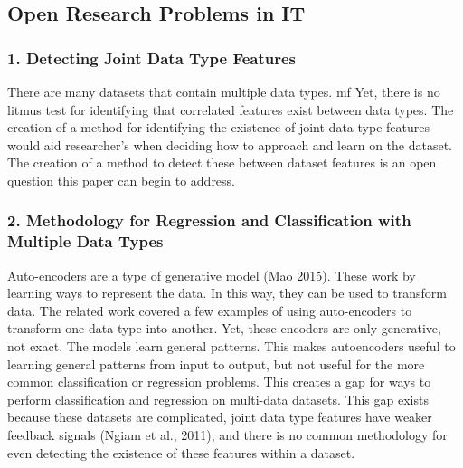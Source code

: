 \subsection{Open Research Problems in IT}

\subsubsection{1. Detecting Joint Data Type Features}
There are many datasets that contain multiple data types. mf Yet, there is no litmus test for identifying that correlated features exist between data types.  The creation of a method for identifying the existence of joint data type features would aid researcher's when deciding how to approach and learn on the dataset.  The creation of a method to detect these between dataset features is an open question this paper can begin to address.

\subsubsection{2. Methodology for Regression and Classification with Multiple Data Types}
Auto-encoders are a type of generative model (Mao 2015). These work by learning ways to represent the data.  In this way, they can be used to transform data.  The related work covered a few examples of using auto-encoders to transform one data type into another.  Yet, these encoders are only generative, not exact.  The models learn general patterns.  This makes autoencoders useful to learning general patterns from input to output, but not useful for the more common classification or regression problems.  This creates a gap for ways to perform classification and regression on multi-data datasets.  This gap exists because these datasets are complicated, joint data type features have weaker feedback signals (Ngiam et al., 2011), and there is no common methodology for even detecting the existence of these features within a dataset.  


